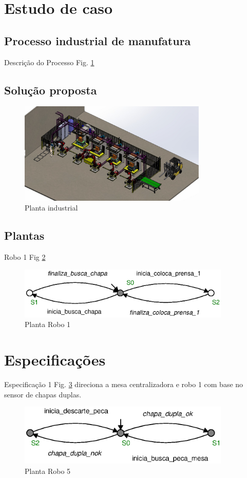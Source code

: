\section{Estudo de caso}
\subsection{Processo industrial de manufatura}
Descrição do Processo Fig. \ref{fig:processo}
\subsection{Solução proposta}
\begin{figure}[H]%
    \centering
    \includegraphics[width=0.8\textwidth]{imagens/processo.eps}
    \caption{Planta industrial}\label{fig:processo}
\end{figure}
\subsection{Plantas}
Robo 1 Fig \ref{fig:robo1}
\begin{figure}[H]%
    \centering
    \includegraphics[width=0.9\textwidth]{imagens/robo_1.eps}
    \caption{Planta Robo 1}\label{fig:robo1}
\end{figure}

\section{Especificações}
Especificação 1 Fig. \ref{fig:especificacao1} direciona a mesa centralizadora e robo 1 com base no sensor de chapas duplas.
\begin{figure}[H]%
    \centering
    \includegraphics[width=0.9\textwidth]{imagens/E1_robo_1_chapa_dupla.eps}
    \caption{Planta Robo 5}\label{fig:especificacao1}
\end{figure}